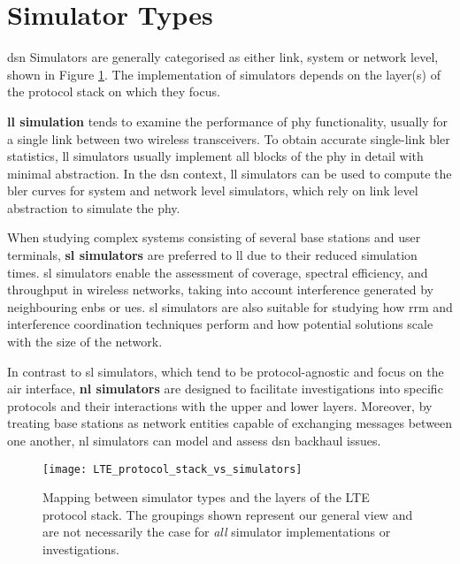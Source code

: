 \documentclass[conference]{IEEEtran}
\begin{document}
\section{Simulator Types}

\ac{dsn} Simulators are generally categorised as either link, system or network level, shown in Figure \ref{fig:protocol_stack}. The implementation of simulators depends on the layer(s) of the protocol stack on which they focus.

\textbf{\ac{ll} simulation} tends to examine the performance of \ac{phy} functionality, usually for a single link between two wireless transceivers. To obtain accurate single-link \ac{bler} statistics, \ac{ll} simulators usually implement all blocks of the \ac{phy} in detail with minimal abstraction. In the \ac{dsn} context, \ac{ll} simulators can be used to compute the \ac{bler} curves for system and network level simulators, which rely on link level abstraction to simulate the \ac{phy}.

When studying complex systems consisting of several base stations and user terminals, \textbf{\acf{sl} simulators} are preferred to \ac{ll}
due to their reduced simulation times. \ac{sl} simulators enable the assessment of coverage, spectral efficiency, and throughput in
wireless networks, taking into account interference generated by neighbouring \acp{enb} or \acp{ue}. \ac{sl} simulators are also suitable
for studying how \ac{rrm} and interference coordination techniques perform and how potential solutions scale with the size of the network.

In contrast to \ac{sl} simulators, which tend to be protocol-agnostic and focus on the air interface, \textbf{\acf{nl} simulators} are designed to
facilitate investigations into specific protocols and their interactions with the upper and lower layers. Moreover, by treating base
stations as network entities capable of exchanging messages between one another, \ac{nl} simulators can model and assess \ac{dsn} backhaul
issues.

\begin{figure}
    \centering
    \texttt{[image: LTE\_protocol\_stack\_vs\_simulators]}
    \caption{Mapping between simulator types and the layers of the LTE protocol stack. The groupings shown represent our general view and are not necessarily the case for \textit{all} simulator implementations or investigations.}
	\vspace{-0.4cm}
    \label{fig:protocol_stack}
\end{figure}
\end{document}

